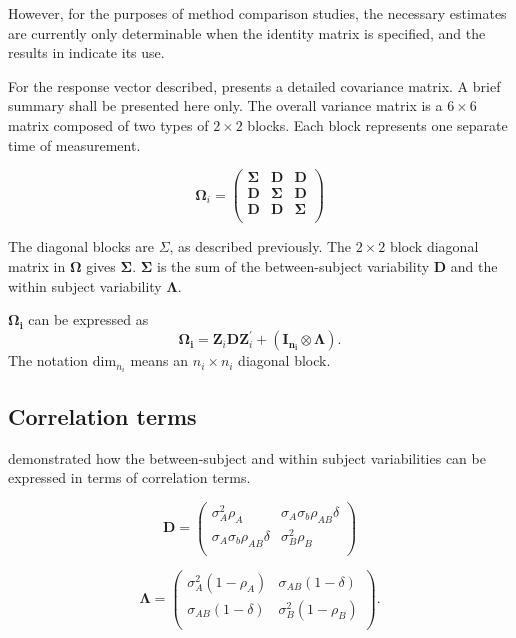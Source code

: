 \documentclass[MAIN.tex]{subfiles}
\begin{document}
	However, for the purposes of method comparison studies, the necessary estimates are currently only determinable when the identity matrix is specified, and the results in \citet{roy} indicate its use.
	
	For the response vector described, \citet{hamlett} presents a detailed covariance matrix. A brief summary shall be presented here only. The overall variance matrix is a $6 \times 6$ matrix composed of two types of $2 \times 2$ blocks. Each block represents one separate time of measurement.
	
	\[
	\boldsymbol{\Omega}_{i} = \left(
	\begin{array}{ccc}
	\boldsymbol{\Sigma} & \boldsymbol{D} & \boldsymbol{D}\\
	\boldsymbol{D} & \boldsymbol{\Sigma} & \boldsymbol{D}\\
	\boldsymbol{D} & \boldsymbol{D} & \boldsymbol{\Sigma}\\
	\end{array}\right)
	\]
	
	The diagonal blocks are $\Sigma$, as described previously. The $2 \times 2$ block diagonal matrix in $\boldsymbol{\Omega}$ gives $\boldsymbol{\Sigma}$. $\boldsymbol{\Sigma}$ is the sum of the between-subject variability $\boldsymbol{D}$ and the within subject variability $\boldsymbol{\Lambda}$.
	
	$\boldsymbol{\Omega_{i}}$ can be expressed as
	\[
	\boldsymbol{\Omega_{i}} = \boldsymbol{Z}_{i}\boldsymbol{D}\boldsymbol{Z}_{i}^\prime + ({\boldsymbol{I_{n_{i}}} \otimes \boldsymbol{\Lambda}}).
	\]
	The notation $\mbox{dim}_{n_{i}}$ means an $n_{i} \times n_{i}$ diagonal block.
	
	\subsection{Correlation terms}
	\citet{hamlett} demonstrated how the between-subject and within subject variabilities can be expressed in terms of
	correlation terms.
	
	\[
	\boldsymbol{D} = \left( \begin{array}{cc}
	\sigma^2_{A}\rho_{A} & \sigma_{A}\sigma_{b}\rho_{AB}\delta \\
	\sigma_{A}\sigma_{b}\rho_{AB}\delta & \sigma^2_{B}\rho_{B}\\
	
	\end{array}\right)
	\]
	
	\[
	\boldsymbol{\Lambda} = \left(
	\begin{array}{cc}
	\sigma^2_{A}(1-\rho_{A}) & \sigma_{AB}(1-\delta)  \\
	\sigma_{AB}(1-\delta) & \sigma^2_{B}(1-\rho_{B}) \\
	\end{array}\right).
	\]
	
\end{document}

